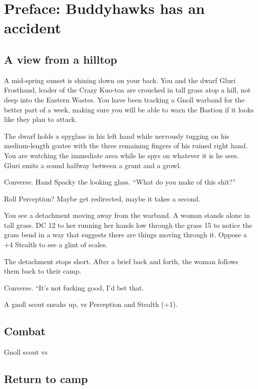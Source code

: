 \section{Preface: Buddyhawks has an accident}
\subsection{A view from a hilltop}
  \begin{aloud}
  A mid-spring sunset is shining down on your back.
  You and the dwarf Gluri Frosthand, leader of the Crazy Kuo-toa are crouched in tall grass atop
    a hill, not deep into the Eastern Wastes.
  You have been tracking a Gnoll warband for the better part of a week, making sure you will be
    able to warn the Bastion if it looks like they plan to attack.

  The dwarf holds a spyglass in his left hand while nervously tugging on his medium-length goatee
    with the three remaining fingers of his ruined right hand.
  You are watching the immediate area while he spys on whatever it is he sees.
  Gluri emits a sound halfway between a grunt and a growl.
  \end{aloud}

Converse.
Hand Spacky the looking glass.  ``What do you make of this shit?''

Roll Perception?  Maybe get redirected, maybe it takes a second.

You see a detachment moving away from the warband.
A woman stands alone in tall grass.
DC 12 to her running her hands low through the grass
15 to notice the grass bend in a way that suggests there are things moving through it.
Oppose a +4 Stealth to see a glint of scales.

The detachment stops short.
After a brief back and forth, the woman follows them back to their camp.

Converse.
``It's not fucking good, I'd bet that.

A gnoll scout sneaks up, vs Perception and Stealth (+1).

\subsection{Combat}
Gnoll scout vs

\subsection{Return to camp}
